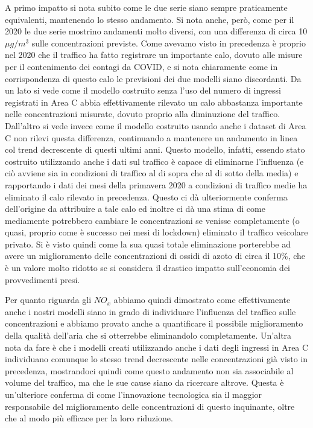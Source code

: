 A primo impatto si nota subito come le due serie siano sempre praticamente equivalenti, mantenendo lo stesso andamento. Si nota anche, però, come per il 2020 le due serie mostrino andamenti molto diversi, con una differenza di circa 10 $\mu g/m^3$ sulle concentrazioni previste.
Come avevamo visto in precedenza è proprio nel 2020 che il traffico ha fatto registrare un importante calo, dovuto alle misure per il contenimento dei contagi da COVID, e si nota chiaramente come in corrispondenza di questo calo le previsioni dei due modelli siano discordanti.
Da un lato si vede come il modello costruito senza l'uso del numero di ingressi registrati in Area C abbia effettivamente rilevato un calo abbastanza importante nelle concentrazioni misurate, dovuto proprio alla diminuzione del traffico. Dall'altro si vede invece come il modello costruito usando anche i dataset di Area C non rilevi questa differenza, continuando a mantenere un andamento in linea col trend decrescente di questi ultimi anni. Questo modello, infatti, essendo stato costruito utilizzando anche i dati sul traffico è capace di eliminarne l'influenza (e ciò avviene sia in condizioni di traffico al di sopra che al di sotto della media) e rapportando i dati dei mesi della primavera 2020 a condizioni di traffico medie ha eliminato il calo rilevato in precedenza. Questo ci dà ulteriormente conferma dell'origine da attribuire a tale calo ed inoltre ci dà una stima di come mediamente potrebbero cambiare le concentrazioni se venisse completamente (o quasi, proprio come è successo nei mesi di lockdown) eliminato il traffico veicolare privato. Si è visto quindi come la sua quasi totale eliminazione porterebbe ad avere un miglioramento delle concentrazioni di ossidi di azoto di circa il 10\%, che è un valore molto ridotto se si considera il drastico impatto sull'economia dei provvedimenti presi.

Per quanto riguarda gli $NO_x$ abbiamo quindi dimostrato come effettivamente anche i nostri modelli siano in grado di individuare l'influenza del traffico sulle concentrazioni e abbiamo provato anche a quantificare il possibile miglioramento della qualità dell'aria che si otterrebbe eliminandolo completamente.
Un'altra nota da fare è che i modelli creati utilizzando anche i dati degli ingressi in Area C individuano comunque lo stesso trend decrescente nelle concentrazioni già visto in precedenza, mostrandoci quindi come questo andamento non sia associabile al volume del traffico, ma che le sue cause siano da ricercare altrove. Questa è un'ulteriore conferma di come l'innovazione tecnologica sia il maggior responsabile del miglioramento delle concentrazioni di questo inquinante, oltre che al modo più efficace per la loro riduzione.


